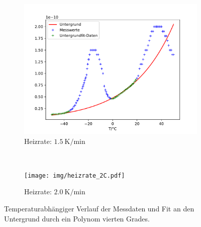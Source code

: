 \begin{figure}[htp]
    \centering
    \begin{subfigure}[t]{0.5\textwidth}
        \centering
        \includegraphics[width=\textwidth]{img/heizrate_15C.pdf}
        \caption{Heizrate: $\SI{1.5}{\kelvin\per\minute}$}
    \end{subfigure}%
    ~
    \begin{subfigure}[t]{0.5\textwidth}
        \centering
        \texttt{[image: img/heizrate\_2C.pdf]}
        \caption{Heizrate: $\SI{2.0}{\kelvin\per\minute}$}
    \end{subfigure}
    \caption{Temperaturabhängiger Verlauf der Messdaten und Fit an den Untergrund durch ein Polynom vierten Grades.}
    \label{fig:bg}
\end{figure}

